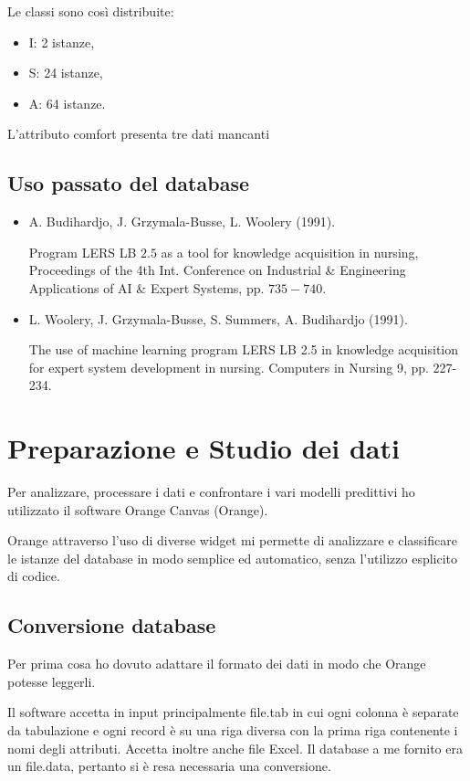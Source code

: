 \documentclass[a4paper, 12p]{report}
\begin{document}
Le classi sono così distribuite:
\begin{itemize}
\item I: 2 istanze,
\item S: 24 istanze,
\item A: 64 istanze.
\end{itemize}
L'attributo comfort presenta tre dati mancanti
\section{Uso passato del database}
\begin{itemize}
\item  A. Budihardjo, J. Grzymala-Busse, L. Woolery (1991). 

Program LERS LB $2.5$ as a tool for knowledge acquisition in nursing, Proceedings of the 4th Int. Conference on Industrial \& Engineering Applications of AI \& Expert Systems, pp. $735-740.$
\item L. Woolery, J. Grzymala-Busse, S. Summers, A. Budihardjo (1991). 

The use of machine learning program LERS LB 2.5 in knowledge acquisition for expert system development in nursing. Computers in Nursing 9, pp. 227-234.			
\end{itemize}
\chapter{Preparazione e Studio dei dati}
Per analizzare, processare i dati e confrontare i vari modelli predittivi ho utilizzato il software Orange Canvas (Orange).
 
Orange attraverso l'uso di diverse widget mi permette di analizzare e classificare le istanze del database in modo semplice ed automatico, senza l'utilizzo esplicito di codice. 

\section{Conversione database}
\noindent Per prima cosa ho dovuto adattare il formato dei dati in modo che Orange potesse leggerli. 

\noindent Il software accetta in input principalmente file.tab in cui ogni colonna è separate da tabulazione e ogni record è su una riga diversa con la prima riga contenente i nomi degli attributi. Accetta inoltre anche file Excel. 
Il database a me fornito era un file.data, pertanto si è resa necessaria una conversione.
\end{document}
